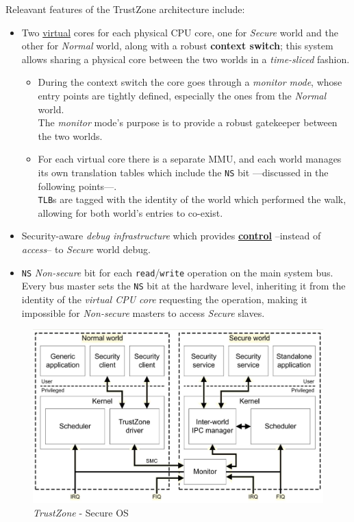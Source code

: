 Releavant features of the TrustZone architecture include:
\begin{itemize}
   \item Two \underline{virtual} cores for each physical CPU core, one for \textit{Secure} world and the other for \textit{Normal} world,
   along with a robust \textbf{context switch};
   this system allows sharing a physical core between the two worlds in a \textit{time-sliced} fashion.
   \begin{itemize}
      \item During the context switch the core goes through a \textit{monitor mode},
      whose entry points are tightly defined,
      especially the ones from the \textit{Normal} world.\\
      The \textit{monitor} mode's purpose is to provide a robust gatekeeper between the two worlds. 
      \item For each virtual core there is a separate MMU, 
      and each world manages its own translation tables which include the \texttt{NS} bit {---}discussed in the following points{---}.\\
      \texttt{TLB}s are tagged with the identity of the world which performed the walk, allowing for both world's entries to co-exist.
   \end{itemize}
   \item Security-aware \textit{debug infrastructure} which provides \textbf{\underline{control}} {--}instead of \textit{access}{--} to \textit{Secure} world debug.
   \item \texttt{NS} \textit{Non-secure} bit for each \texttt{read}/\texttt{write} operation on the main system bus.\\
   Every bus master sets the \texttt{NS} bit at the hardware level, inheriting it from the identity of the \textit{virtual CPU core} requesting the operation,
   making it impossible for \textit{Non-secure} masters to access \textit{Secure} slaves.
\end{itemize} 

\begin{figure}[htbp]
   \centering
   \includegraphics{images/TrustZone_secureOS.png}
   \caption{\textit{TrustZone} - Secure OS}
   \label{fig:trustzone_secureOS}
\end{figure}

